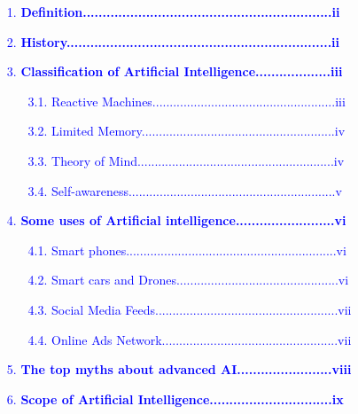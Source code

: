 \documentclass[12pt]{article}
\begin{document}
\begin{itemize}
\item[\textcolor{blue}{1.}] \textbf{\textcolor{blue}{Definition...............................................................ii}}
\item[\textcolor{blue}{2.}]\textbf{\textcolor{blue}{History...................................................................ii}}
\item[\textcolor{blue}{3.}]\textbf{\textcolor{blue}
{Classification of Artificial Intelligence...................iii}}
\begin{enumerate}
   \item[\textcolor{blue}{3.1.}]\textcolor{blue}{Reactive Machines.....................................................iii}
   \item[\textcolor{blue}{3.2.}]\textcolor{blue}{Limited Memory........................................................iv}
   \item[\textcolor{blue}{3.3.}]\textcolor{blue}{Theory of Mind.........................................................iv}
   \item[\textcolor{blue}{3.4.}]\textcolor{blue}{Self-awareness............................................................v}
\end{enumerate}
\item[\textcolor{blue}{4.}]\textbf{\textcolor{blue}{Some uses of Artificial intelligence.........................vi}}
\begin{enumerate}
   \item[\textcolor{blue}{4.1.}]\textcolor{blue}{Smart phones.............................................................vi}
   \item[\textcolor{blue}{4.2.}]\textcolor{blue}{Smart cars and Drones...............................................vi}
   \item[\textcolor{blue}{4.3.}]\textcolor{blue}{Social Media Feeds.....................................................vii}
   \item[\textcolor{blue}{4.4.}]\textcolor{blue}{Online Ads Network...................................................vii}
\end{enumerate}
\item[\textcolor{blue}{5.}]\textbf{\textcolor{blue}{The top myths about advanced AI........................viii}}
\item[\textcolor{blue}{6.}]\textbf{\textcolor{blue}{Scope of Artificial Intelligence...............................ix}}
\begin{enumerate}

\end{enumerate}
\end{itemize}
\end{document}
